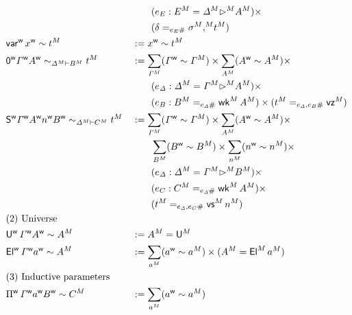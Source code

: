 \begin{definition}
\begin{alignat*}{5}
    & && \qquad
    (e_E : \model{E} = \model{\GD} \model{\ext} \model{A}) \times
    \\
    & && \qquad
    (\delta = _{e_E \#} \model\sigma \model{\cons} \model{t} )
    \\
  & \varw\,\wf{x} \sim \model{t}
   && := \wf{x}\sim \model{t} \\
   & \relV{\vzw\wf{\GG}\wf{A}}{\model{\GD}}{\model{B}}{\model{t}}
   && :=
    \sum_{\model{\GG}} (\wf{\GG}\sim\model{\GG}) \times
    \sum_{\model{A}} (\wf{A}\sim\model{A}) \times \\
    & &&
    \qquad
  (e_\GD : \model{\GD} = \model{\GG} \model{\ext} \model{A})
     \times
    \\
    & && \qquad
     (e_B : \model{B} = _{e_\GD \#} \model{\wk}\,\model{A}) \times
     (\model{t} = _{e_\GD,e_B \#} \model{\vz})
  \\
  &
   \relV{\vsw \wf{\GG} \wf{A} \wf{n} \wf{B}}{\model\GD}{\model{C}}{\model{t}}
   && :=
    \sum_{\model{\GG}} (\wf{\GG}\sim\model{\GG}) \times
    \sum_{\model{A}} (\wf{A}\sim\model{A}) \times
    \\
    & &&\qquad
    \sum_{\model{B}} (\wf{B}\sim\model{B}) \times
    \sum_{\model{n}} (\wf{n}\sim\model{n}) \times
    \\
    & &&
    \qquad
  (e_\GD : \model{\GD} = \model{\GG} \model{\ext} \model{B})
     \times
    \\
    & && \qquad
     (e_C : \model{C} = _{e_\GD \#} \model{\wk}\,\model{A}) \times
     \\
     & && \qquad
     (\model{t} = _{e_\GD,e_C \#} \model{\vs} \, \model{n})
  \\
  & \rlap{(2) Universe} \\
  & \Uw\, \wf{\GG} \wf{A} \sim \model{A} &&
   := \model{A} = \model{\U}
  \\
  & \Elw\, \wf{\GG} \wf{a} \sim \model{A}
  && :=
  \sum_{\model{a}} (\wf{a}\sim  \model{a}) \times
    (\model{A} = \model{\El}\,\model{a})
  \\
  & \rlap{(3) Inductive parameters} \\
  & \Piw\,\wf{\GG} \wf{a} \wf{B} \sim \model{C} &&
   :=
      \sum_{\model{a}} (\wf{a}\sim\model{a})

\end{alignat*}
\end{definition}
